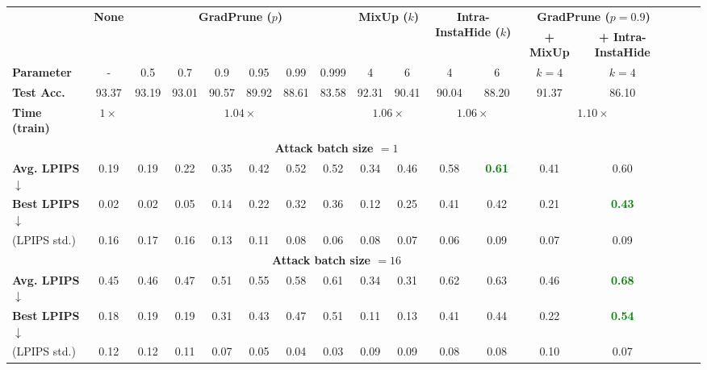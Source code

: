 \newcommand{\best}[1]{\textcolor{green}{\textbf{#1}}}
\begin{table}[t] 
  \scriptsize
  \setlength{\tabcolsep}{2.8pt}
  \renewcommand{\arraystretch}{0.95}
  \begin{tabular}{|l|c|c|c|c|c|c|c|c|c|c|c|c|c|c|c|c|}
  \toprule
   &  \multirow{2}{*}{\bf None} & \multicolumn{6}{c|}{\multirow{2}{*}{\bf GradPrune ($p$)}} & \multicolumn{2}{c|}{\multirow{2}{*}{\bf MixUp ($k$)}} & \multicolumn{2}{c|}{\multirow{2}{*}{\bf Intra-InstaHide ($k$)}} & \multicolumn{2}{c|}{\bf GradPrune ($p=0.9$)}\\
   & & \multicolumn{6}{c|}{} & \multicolumn{2}{c|}{} & \multicolumn{2}{c|}{} & {\bf  + MixUp } & {\bf  + Intra-InstaHide}\\
  \midrule
   {\bf Parameter}  & - & 0.5 & 0.7 & 0.9 & 0.95 & 0.99 & 0.999 & 4 & 6 & 4 & 6 & $k=4$ & $k=4$ \\
   \midrule
   {\bf Test Acc.} & 93.37 & 93.19 & 93.01 & 90.57 & 89.92 & 88.61 & 83.58 &  92.31 & 90.41 & 90.04 & 88.20 & 91.37 & 86.10 \\
   \midrule
   {\bf Time (train)} & $1\times$ & \multicolumn{6}{c|}{$1.04\times$} & \multicolumn{2}{c|}{$1.06\times$} & \multicolumn{2}{c|}{$1.06\times$} & \multicolumn{2}{c|}{$1.10\times$} \\
   \midrule
   \multicolumn{14}{|c|}{\bf Attack batch size $= 1$} \\
   \midrule
   {\bf Avg. LPIPS $\downarrow$}  & 0.19  & 0.19  & 0.22  & 0.35  & 0.42  & 0.52  & 0.52  & 0.34  & 0.46  & 0.58  & \best{0.61}  & 0.41  & 0.60\\
   {\bf Best LPIPS $\downarrow$}  & 0.02  & 0.02  & 0.05  & 0.14  & 0.22  & 0.32  & 0.36  & 0.12  & 0.25  & 0.41  & 0.42  & 0.21  & \best{0.43}\\
   {(LPIPS std.)}                 & 0.16  & 0.17  & 0.16  & 0.13  & 0.11  & 0.08  & 0.06  & 0.08  & 0.07  & 0.06  & 0.09  & 0.07  & 0.09\\
   \midrule
   \multicolumn{14}{|c|}{\bf Attack batch size $= 16$} \\
   \midrule
   {\bf Avg. LPIPS $\downarrow$}  & 0.45  & 0.46  & 0.47  & 0.51  & 0.55  & 0.58  & 0.61    & 0.34  & 0.31  & 0.62  & 0.63  & 0.46  & \best{0.68}\\
   {\bf Best LPIPS $\downarrow$}  & 0.18  & 0.19  & 0.19  & 0.31  & 0.43  & 0.47  & 0.51    & 0.11  & 0.13  & 0.41  & 0.44  & 0.22  & \best{0.54}\\
   {(LPIPS std.)}                 & 0.12  & 0.12  & 0.11  & 0.07  & 0.05  & 0.04  & 0.03    & 0.09  & 0.09  & 0.08  & 0.08  & 0.10  & 0.07\\

\end{tabular}
\end{table}
